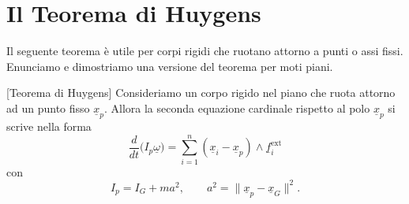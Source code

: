 \section{Il Teorema di Huygens}

Il seguente teorema è utile per corpi rigidi che ruotano attorno a punti o
assi fissi. Enunciamo e dimostriamo una versione del teorema per moti piani.
\begin{theorem}{}[Teorema di Huygens]
Consideriamo un corpo rigido nel piano che ruota attorno ad un punto fisso
\(\underline{x}_p\). Allora la seconda equazione cardinale rispetto al polo
\(\underline{x}_p\) si scrive nella forma
\[
\frac{d}{dt}\bigl(I_p\underline{\omega}\bigr)
=
\sum_{i=1}^{n} (\underline{x}_i-\underline{x}_p)\wedge \underline{f}_i^{\mathrm{ext}}
\]
con
\[
I_p=I_G+ma^2,
\qquad
a^2=\|\underline{x}_p-\underline{x}_G\|^2.
\]
\end{theorem}


